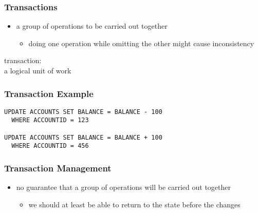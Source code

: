 \documentclass[dvipsnames]{beamer}
\theoremstyle{plain}
\begin{document}
\begin{frame}
  \frametitle{Transactions}

  \begin{itemize}
    \item a group of operations to be carried out together
    \begin{itemize}
      \item doing one operation while omitting the other might cause
        inconsistency
    \end{itemize}
  \end{itemize}

  \pause
  \begin{definition}
    \alert{transaction}:\\
      a logical unit of work
  \end{definition}
\end{frame}

\begin{frame}[fragile]
  \frametitle{Transaction Example}

  \begin{example}
    \begin{lstlisting}
UPDATE ACCOUNTS SET BALANCE = BALANCE - 100
  WHERE ACCOUNTID = 123

UPDATE ACCOUNTS SET BALANCE = BALANCE + 100
  WHERE ACCOUNTID = 456
    \end{lstlisting}
  \end{example}
\end{frame}

\begin{frame}
  \frametitle{Transaction Management}

  \begin{itemize}
    \item no guarantee that a group of operations will be carried out together
    \begin{itemize}
      \item we should at least be able to return to the state before the
        changes
    \end{itemize}
  \end{itemize}
\end{frame}
\end{document}
